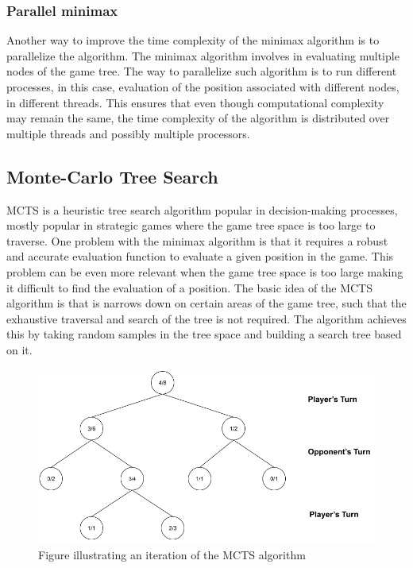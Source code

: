 \subsubsection{Parallel minimax}
Another way to improve the time complexity of the minimax algorithm is to parallelize the algorithm. The minimax algorithm involves in evaluating multiple nodes of the game tree. The way to parallelize such algorithm is to run different processes, in this case, evaluation of the position associated with different nodes, in different threads. This ensures that even though computational complexity may remain the same, the time complexity of the algorithm is distributed over multiple threads and possibly multiple processors.


\subsection{Monte-Carlo Tree Search}\label{sec:MCTS}
\gls{MCTS} \citep{Coulom2006Efficient} is a heuristic tree search algorithm popular in decision-making processes, mostly popular in strategic games where the game tree space is too large to traverse. One problem with the minimax algorithm is that it requires a robust and accurate evaluation function to evaluate a given position in the game. This problem can be even more relevant when the game tree space is too large making it difficult to find the evaluation of a position. The basic idea of the \gls{MCTS} algorithm is that is narrows down on certain areas of the game tree, such that the exhaustive traversal and search of the tree is not required. The algorithm achieves this by taking random samples in the tree space and building a search tree based on it.

\begin{figure}[!ht]
    \centering
    \includegraphics[width = \linewidth]{../img/MCTS1.png}
    \caption{Figure illustrating an iteration of the MCTS algorithm}
    \label{fig:MCTS1}
\end{figure}

